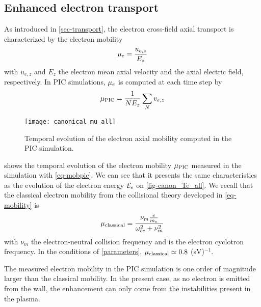   \subsection{Enhanced electron transport} \label{subsec-canonmue}
  As introduced in \cref{sec-transport}, the electron cross-field axial transport is characterized by the electron mobility
  \begin{equation} \label{eq-mobdef}
    \mu_e = \frac{u_{e, z}}{E_z}
  \end{equation}
  with $u_{e,z}$ and $E_z$ the electron mean axial velocity and the axial electric field, respectively.
  In \ac{PIC} simulations, $\mu_e$ is computed at each time step by
  \begin{equation} \label{eq-mobpic}
    \mu_{\mathrm{PIC}} = \frac{1}{N E_z} \sum_N v_{e,z}
  \end{equation}

  \begin{figure}[hbt]
    \centering
    \texttt{[image: canonical\_mu\_all]}
    \caption{Temporal evolution of the electron axial mobility computed in the \acs{PIC} simulation.}
    \label{fig-canon_mu}
  \end{figure}
  
   shows the temporal evolution of the electron mobility $\mu_{\mathrm{PIC}}$ measured in the simulation with \cref{eq-mobpic}.
  We can see that it presents the same characteristics as the evolution of the electron energy ${\mathcal{E}_e}$ on \cref{fig-canon_Te_all}.
  We recall that the classical electron mobility from the collisional theory developed in \cref{eq-mobility} is \citep{lafleur2016a}
  \begin{equation} \label{eq-muclass}
    \mu_{\mathrm{classical}} = \frac{\nu_m \frac{e}{m_e}}{\omega_{ce}^2 + \nu_m^2}
  \end{equation}
  with $\nu_m$ the electron-neutral  collision frequency and \oce{} is the electron cyclotron frequency.
  In the conditions of \cref{parameters}, $\mu_{\mathrm{classical}} \simeq 0.8$ \square\meter(sV)$^{-1}$.
  
  The measured electron mobility in the \ac{PIC} simulation is one order of magnitude larger than the classical mobility.
  In the present case, as no electron is emitted from the wall, the enhancement can only come from the instabilities present in the plasma.

